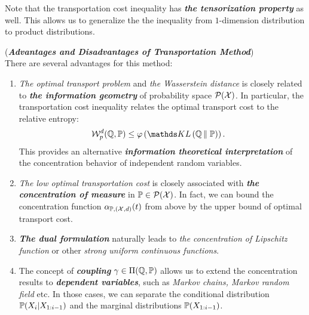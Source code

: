 \documentclass[11pt]{article}
\begin{document}
\begin{enumerate}
Note that the transportation cost inequality has \emph{\textbf{the tensorization property}} as well. This allows us to generalize the the inequality from $1$-dimension distribution to product distributions.

\begin{remark} (\textbf{\emph{Advantages and Disadvantages of  Transportation Method}})\\
There are several advantages for this method:
\begin{enumerate}
\item \emph{The optimal transport problem} and \emph{the Wasserstein distance} is closely related to \emph{\textbf{the information geometry}} of probability space ${\mathcal P}({\mathcal X})$. In particular, the transportation cost inequality relates the optimal transport cost to the relative entropy:
\begin{align*}
\cW_{p}^{d}(\bQ, \bP) &\le \varphi\paren{\kl{\bQ}{\bP}}.
\end{align*} This provides an alternative \emph{\textbf{information theoretical interpretation}} of the concentration behavior of independent random variables.

\item  \emph{The low optimal transportation cost}  is closely associated with \emph{\textbf{the concentration of measure}} in ${\mathbb P} \in {\mathcal P}({\mathcal X})$. In fact, we can bound the concentration function $\alpha_{{\mathbb P}, ({\mathcal X}, d)}(t)$ from above by the upper bound of optimal transport cost.

\item \emph{\textbf{The dual formulation}} naturally leads to \emph{the concentration of Lipschitz function} or other \emph{strong uniform continuous functions}.

\item The concept of \emph{\textbf{coupling}} $\gamma \in \Pi({\mathbb Q}, {\mathbb P})$ allows us to extend the concentration results to \emph{\textbf{dependent variables}}, such as \emph{Markov chains, Markov random field} etc. In those cases, we can separate the conditional distribution ${\mathbb P}(X_{i} | X_{1:i-1})$  and the marginal distributions ${\mathbb P}(X_{1:i-1})$.
\end{enumerate}
\end{remark}
\end{enumerate}


\newpage
\end{document}
